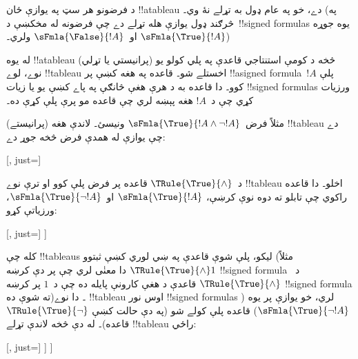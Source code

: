\documentclass[../../../include/open-logic-section]{subfiles}
\begin{document}
\begin{ex}
  د فرضونو هر سټ په يوازې ځان !!a{tableau} دے، خو په عام ډول به
  تړلے نۀ وي۔ (په څرګند ډول يوازې هله تړلے دے چې فرضونه له مخکښې
  د~!!{signed formula}s يوه جوړه
  $\sFmla{\True}{!A}$ او~$\sFmla{\False}{!A}$ ولري۔)

  له يوه !!a{tableau} (پرانيستي يا تړلي) څخه د کومې استنتاجي قاعدې
  په پلي کولو يو نوے، لوے !!{tableau} اخستلے شو۔ قاعده په هغه کښې پر
  !!a{signed formula}~$!A$ پلې کوو۔ دا قاعده به د هرې هغې څانګې په
  پاے کښې يو يا زيات !!{signed formula}s ورزيات کړي چې د~$!A$ هغه
  پېښه لري چې قاعده مو پرې پلې کړې ده۔

  مثلاً فرض~$\sFmla{\True}{!A \land \lnot !A}$ ونيسئ۔ لاندې هغه
  (پرانيستے) !!{tableau} دے چې يوازې له همدې فرض څخه جوړ دے:
  \begin{center}
    \begin{tableau}{}
      [, just=\TAss]
    \end{tableau}{}
  \end{center}
  د~$\TRule{\True}{\land}$ قاعده پر فرض پلې کوو او ترې نوے
  !!{tableau} اخلو۔ دا قاعده راکوي چې تابلو ته دوه نوې کرښې،
  $\sFmla{\True}{!A}$ او~$\sFmla{\True}{\lnot !A}$، ورزياتې کړو:
  \begin{center}
    \begin{tableau}{}
      [, just=\TAss
        [\sFmla{\True}{\formula{A}}, just={\TRule{\True}{\land}[1]},
          [\sFmla{\True}{\lnot \formula{A}}, just={\TRule{\True}{\land}[1]}
          ]
        ]
      ]
    \end{tableau}{}
  \end{center}
  کله چې !!{tableau}s ليکو، پلې شوې قاعدې په ښي لوري کښې ثبتوو
  (مثلاً $\TRule{\True}{\land} 1$ دا معنٰی لري چې پر دې کرښه
  !!{signed formula} د~$\TRule{\True}{\land}$ قاعدې د هغې کارونې
  پايله ده چې د~$1$ پر کرښه !!{signed formula} ته شوې ده)۔ دا نوے
  !!{tableau} اوس نور !!{signed formula}s لري، خو يوازې پر يوه
  ($\sFmla{\True}{\lnot !A}$) قاعده پلې کولے شو (په دې حالت کښې
  $\TRule{\True}{\lnot}$ قاعده)۔ له دې څخه لاندې تړلے
  !!{tableau} راځي:
  \begin{center}
    \begin{tableau}{}
      [, just=\TAss
        [\sFmla{\True}{\formula{A}}, just={\TRule{\True}{\land}[1]}
          [\sFmla{\True}{\lnot \formula{A}}, just={\TRule{\True}{\land}[1]}
            [\sFmla{\False}{\formula{A}}, just={\TRule{\True}{\lnot}[3]}, close]
          ]
        ]
      ]
    \end{tableau}{}
  \end{center}
\end{ex}
\end{document}
